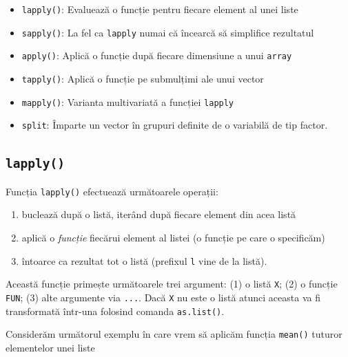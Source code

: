\documentclass[]{article}
\providecommand{\tightlist}{%
  \setlength{\itemsep}{0pt}\setlength{\parskip}{0pt}}
\begin{document}
\begin{itemize}
\item
  \texttt{lapply()}: Evaluează o funcție pentru fiecare element al unei
  liste
\item
  \texttt{sapply()}: La fel ca \texttt{lapply} numai că încearcă să
  simplifice rezultatul
\item
  \texttt{apply()}: Aplică o funcție după fiecare dimensiune a unui
  \texttt{array}
\item
  \texttt{tapply()}: Aplică o funcție pe submulțimi ale unui vector
\item
  \texttt{mapply()}: Varianta multivariată a funcției \texttt{lapply}
\item
  \texttt{split}: Împarte un vector în grupuri definite de o variabilă
  de tip factor.
\end{itemize}

\subsection{\texorpdfstring{\texttt{lapply()}}{lapply()}}\label{lapply}

Funcția \texttt{lapply()} efectuează următoarele operații:

\begin{enumerate}
\def\labelenumi{\arabic{enumi}.}
\tightlist
\item
  buclează după o listă, iterând după fiecare element din acea listă
\item
  aplică o \emph{funcție} fiecărui element al listei (o funcție pe care
  o specificăm)
\item
  întoarce ca rezultat tot o listă (prefixul \texttt{l} vine de la
  listă).
\end{enumerate}

Această funcție primește următoarele trei argument: (1) o listă
\texttt{X}; (2) o funcție \texttt{FUN}; (3) alte argumente via
\texttt{...}. Dacă \texttt{X} nu este o listă atunci aceasta va fi
transformată într-una folosind comanda \texttt{as.list()}.

Considerăm următorul exemplu în care vrem să aplicăm funcția
\texttt{mean()} tuturor elementelor unei liste
\end{document}
